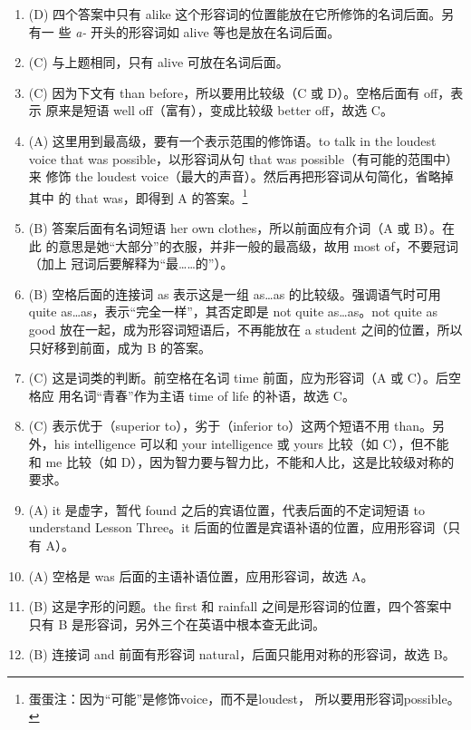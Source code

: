 \begin{enumerate}
\item (D) 四个答案中只有 alike 这个形容词的位置能放在它所修饰的名词后面。另有一
  些 \emph{a-} 开头的形容词如 alive 等也是放在名词后面。
\item  (C) 与上题相同，只有 alive 可放在名词后面。
\item (C) 因为下文有 than before，所以要用比较级（C 或 D）。空格后面有 off，表示
  原来是短语 well off（富有），变成比较级 better off，故选 C。
\item (A) 这里用到最高级，要有一个表示范围的修饰语。to talk in the loudest
  voice that was possible，以形容词从句 that was possible（有可能的范围中）来
  修饰 the loudest voice（最大的声音）。然后再把形容词从句简化，省略掉其中
  的 that was，即得到 A 的答案。\footnote{蛋蛋注：因为“可能”是修饰voice，而不是loudest，
    所以要用形容词possible。}
\item (B) 答案后面有名词短语 her own clothes，所以前面应有介词（A 或 B）。在此
  的意思是她“大部分”的衣服，并非一般的最高级，故用 most of，不要冠词（加上
  冠词后要解释为“最……的”）。
\item (B) 空格后面的连接词 as 表示这是一组 as…as 的比较级。强调语气时可用 quite as…as，表示“完全一样”，其否定即是 not quite as…as。not quite as good 放在一起，成为形容词短语后，不再能放在 a student 之间的位置，所以只好移到前面，成为 B 的答案。

\item (C) 这是词类的判断。前空格在名词 time 前面，应为形容词（A 或 C）。后空格应
  用名词“青春”作为主语 time of life 的补语，故选 C。

\item (C) 表示优于（superior to），劣于（inferior to）这两个短语不用 than。另
  外，his intelligence 可以和 your intelligence 或 yours 比较（如 C），但不能
  和 me 比较（如 D），因为智力要与智力比，不能和人比，这是比较级对称的要求。

\item (A) it 是虚字，暂代 found 之后的宾语位置，代表后面的不定词短语 to understand Lesson Three。it 后面的位置是宾语补语的位置，应用形容词（只有 A）。
\item (A) 空格是 was 后面的主语补语位置，应用形容词，故选 A。

\item  (B) 这是字形的问题。the first 和 rainfall 之间是形容词的位置，四个答案中只有 B 是形容词，另外三个在英语中根本查无此词。

\item  (B) 连接词 and 前面有形容词 natural，后面只能用对称的形容词，故选 B。


\end{enumerate}
